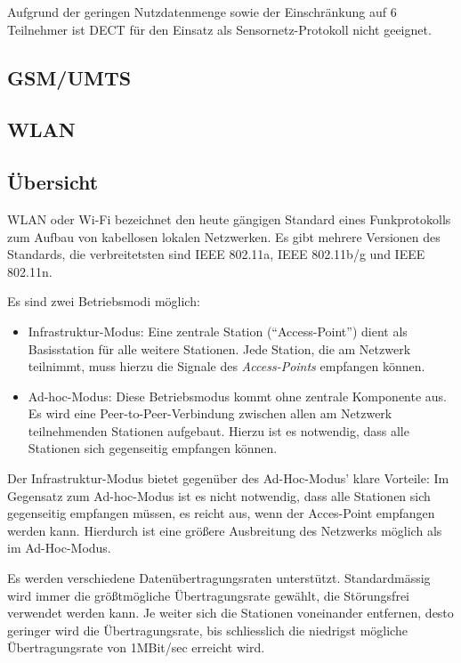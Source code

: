 Aufgrund der geringen Nutzdatenmenge sowie der Einschränkung auf 6 Teilnehmer ist
DECT für den Einsatz als Sensornetz-Protokoll nicht geeignet.

\subsection{GSM/UMTS}


\subsection{WLAN}\label{wlan}
\subsection{Übersicht}
WLAN oder Wi-Fi bezeichnet den heute gängigen Standard eines Funkprotokolls zum Aufbau
von kabellosen lokalen Netzwerken. Es gibt mehrere Versionen des Standards, die verbreitetsten
sind IEEE 802.11a, IEEE 802.11b/g und IEEE 802.11n. 

Es sind zwei Betriebsmodi möglich:

\begin{itemize}
    \item{Infrastruktur-Modus:} Eine zentrale Station ("`Access-Point"') dient als Basisstation
                                für alle weitere Stationen. Jede Station, die am Netzwerk
                                teilnimmt, muss hierzu die Signale des \textsl{Access-Points} 
                                empfangen können.
    \item{Ad-hoc-Modus:} Diese Betriebsmodus kommt ohne zentrale Komponente aus. Es wird eine
                         Peer-to-Peer-Verbindung zwischen allen am Netzwerk teilnehmenden 
                         Stationen aufgebaut. Hierzu ist es notwendig, dass alle Stationen
                         sich gegenseitig empfangen können.
\end{itemize}

Der Infrastruktur-Modus bietet gegenüber des Ad-Hoc-Modus' klare Vorteile: Im Gegensatz
zum Ad-hoc-Modus ist es nicht notwendig, dass alle Stationen sich gegenseitig empfangen
müssen, es reicht aus, wenn der Acces-Point empfangen werden kann. Hierdurch ist eine
größere Ausbreitung des Netzwerks möglich als im Ad-Hoc-Modus. 

Es werden verschiedene Datenübertragungsraten unterstützt. Standardmässig wird
immer die größtmögliche Übertragungsrate gewählt, die Störungsfrei verwendet
werden kann. Je weiter sich die Stationen voneinander entfernen, desto geringer
wird die Übertragungsrate, bis schliesslich die niedrigst mögliche Übertragungsrate von
1MBit/sec erreicht wird.

